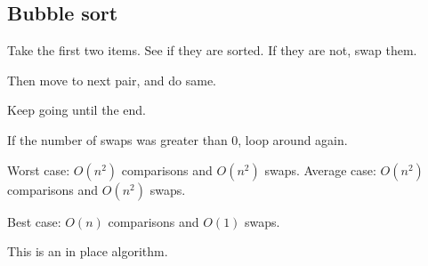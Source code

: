 
\subsection{Bubble sort}

Take the first two items. See if they are sorted. If they are not, swap them.

Then move to next pair, and do same.

Keep going until the end.

If the number of swaps was greater than 0, loop around again.

Worst case: \(O(n^2)\) comparisons and \(O(n^2)\) swaps.
Average case: \(O(n^2)\) comparisons and \(O(n^2)\) swaps.

Best case: \(O(n)\) comparisons and \(O(1)\) swaps.

This is an in place algorithm.

